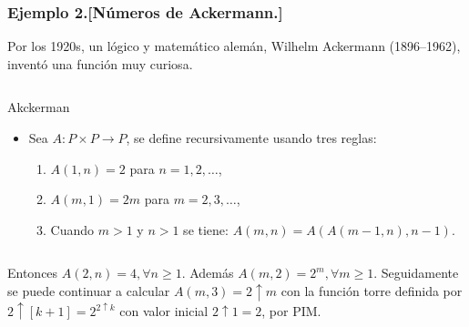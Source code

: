 \begin{frame}
\frametitle{Ejemplo 2.[Números de Ackermann.]}
Por los 1920s, un lógico y matemático alemán, Wilhelm Ackermann (1896–1962), inventó una función muy curiosa.
\begin{columns}
	\begin{column}{\textwidth}
		\begin{block}{Akckerman}
				\begin{itemize}
				\item Sea $A\colon P\times P\rightarrow P$, se define recursivamente usando tres reglas:
				\begin{enumerate}
					\item $A(1,n)=2$ para $n=1,2,\ldots$,
					\item $A(m,1)=2m$ para $m=2,3,\ldots$,
					\item Cuando $m>1$ y $n>1$ se tiene: $A\left(m,n\right)=A\left(A(m-1,n),n-1\right)$.
				\end{enumerate}
			\end{itemize}
		\end{block}
	\end{column}
\end{columns}

Entonces $A(2,n)=4,\forall n\geq1$. Además $A(m,2)=2^{m},\forall m\geq 1$. Seguidamente se puede continuar a calcular $A\left(m,3\right)=2\uparrow m$ con la función torre definida por $2\uparrow[k+1]=2^{2\uparrow k}$ con valor inicial $2\uparrow 1=2$, por PIM.
\end{frame}
